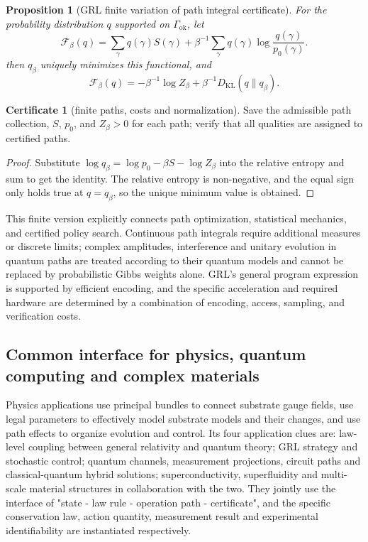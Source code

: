 \documentclass[11pt,a4paper]{article}
\theoremstyle{plain}
\newtheorem{proposition}[theorem]{Proposition}
\theoremstyle{definition}
\newtheorem*{certificate}{Certificate}
\theoremstyle{remark}
\begin{document}
\begin{CJK*}
\begin{proposition}
[GRL finite variation of path integral certificate]\label{fa:prop-gibbs}
For the probability distribution $q$ supported on $\Gamma_{\mathrm{ok}}$, let \[
 \mathcal F_\beta(q)=\sum_\gamma q(\gamma)S(\gamma)
 +\beta^{-1}\sum_\gamma q(\gamma)
 \log\frac{q(\gamma)}{p_0(\gamma)}.
\] then $q_\beta$ uniquely minimizes this functional, and \[
 \mathcal F_\beta(q)=-\beta^{-1}\log Z_\beta
 +\beta^{-1}D_{\mathrm{KL}}(q\|q_\beta).
\]\end{proposition}
\begin{certificate}
[finite paths, costs and normalization]Save the admissible path collection, $S$, $p_0$, and $Z_\beta>0$ for each path; verify that all qualities are assigned to certified paths.\end{certificate}
\begin{proof}
Substitute $\log q_\beta=\log p_0-\beta S-\log Z_\beta$ into the relative entropy and sum to get the identity. The relative entropy is non-negative, and the equal sign only holds true at $q=q_\beta$, so the unique minimum value is obtained.\end{proof}


This finite version explicitly connects path optimization, statistical mechanics, and certified policy search. Continuous path integrals require additional measures or discrete limits; complex amplitudes, interference and unitary evolution in quantum paths are treated according to their quantum models and cannot be replaced by probabilistic Gibbs weights alone. GRL's general program expression is supported by efficient encoding, and the specific acceleration and required hardware are determined by a combination of encoding, access, sampling, and verification costs. \cite{S02,S16}

\subsection { Common interface for physics, quantum computing and complex materials }

Physics applications use principal bundles to connect substrate gauge fields, use legal parameters to effectively model substrate models and their changes, and use path effects to organize evolution and control. Its four application clues are: law-level coupling between general relativity and quantum theory; GRL strategy and stochastic control; quantum channels, measurement projections, circuit paths and classical-quantum hybrid solutions; superconductivity, superfluidity and multi-scale material structures in collaboration with the two. They jointly use the interface of "state - law rule - operation path - certificate", and the specific conservation law, action quantity, measurement result and experimental identifiability are instantiated respectively. \cite{S02}


\end{CJK*}
\end{document}

